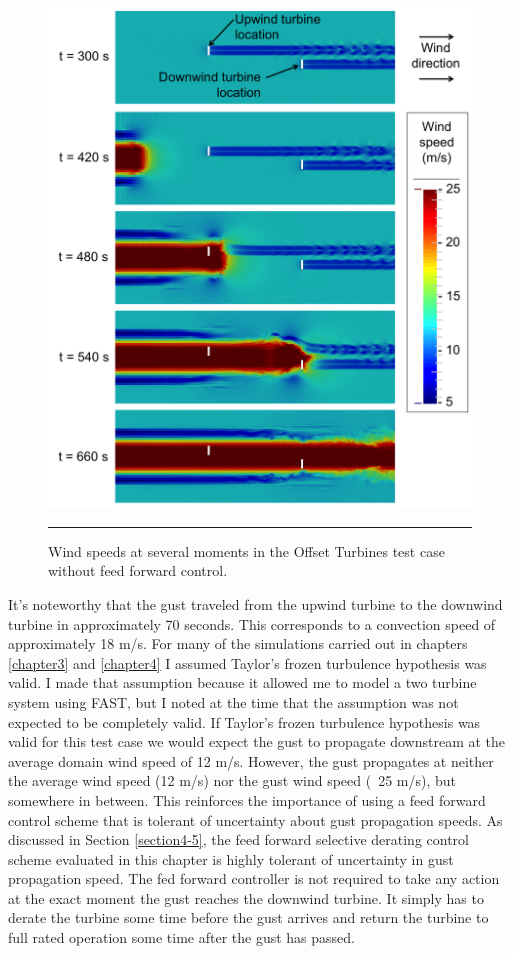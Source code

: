  \begin{figure}[htbp] \label{fig6-14} 
	\centering
		\includegraphics[width = \linewidth]{Figures/ch6Figures/fig6-14.png}
		\rule{35em}{0.5pt}
	\caption{Wind speeds at several moments in the Offset Turbines test case without feed forward control.}
\end{figure}

It's noteworthy that the gust traveled from the upwind turbine to the downwind turbine in approximately 70 seconds. This corresponds to a convection speed of approximately 18 m/s. For many of the simulations carried out in chapters \ref{chapter3} and \ref{chapter4} I assumed Taylor's frozen turbulence hypothesis was valid. I made that assumption because it allowed me to model a two turbine system using FAST, but I noted at the time that the assumption was not expected to be completely valid. If Taylor's frozen turbulence hypothesis was valid for this test case we would expect the gust to propagate downstream at the average domain wind speed of 12 m/s. However, the gust propagates at neither the average wind speed (12 m/s) nor the gust wind speed (~25 m/s), but somewhere in between. This reinforces the importance of using a feed forward control scheme that is tolerant of uncertainty about gust propagation speeds. As discussed in Section \ref{section4-5}, the feed forward selective derating control scheme evaluated in this chapter is highly tolerant of uncertainty in gust propagation speed. The fed forward controller is not required to take any action at the exact moment the gust reaches the downwind turbine. It simply has to derate the turbine some time before the gust arrives and return the turbine to full rated operation some time after the gust has passed.

